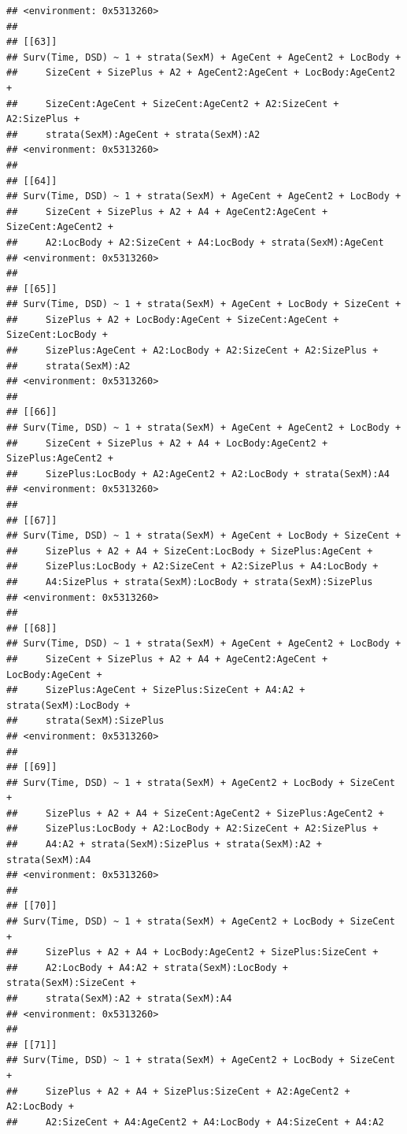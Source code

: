 \documentclass{article}\usepackage[]{graphicx}\usepackage[]{color}
\makeatletter
\newenvironment{kframe}{%
 \def\at@end@of@kframe{}%
 \ifinner\ifhmode%
  \def\at@end@of@kframe{\end{minipage}}%
  \begin{minipage}{\columnwidth}%
 \fi\fi%
 \def\FrameCommand##1{\hskip\@totalleftmargin \hskip-\fboxsep
 \colorbox{shadecolor}{##1}\hskip-\fboxsep
     \hskip-\linewidth \hskip-\@totalleftmargin \hskip\columnwidth}%
 \MakeFramed {\advance\hsize-\width
   \@totalleftmargin\z@ \linewidth\hsize
   \@setminipage}}%
 {\par\unskip\endMakeFramed%
 \at@end@of@kframe}
\newenvironment{knitrout}{}{} %
\makeatother
\begin{document}
\begin{knitrout}
\begin{kframe}
\begin{verbatim}
## <environment: 0x5313260>
## 
## [[63]]
## Surv(Time, DSD) ~ 1 + strata(SexM) + AgeCent + AgeCent2 + LocBody + 
##     SizeCent + SizePlus + A2 + AgeCent2:AgeCent + LocBody:AgeCent2 + 
##     SizeCent:AgeCent + SizeCent:AgeCent2 + A2:SizeCent + A2:SizePlus + 
##     strata(SexM):AgeCent + strata(SexM):A2
## <environment: 0x5313260>
## 
## [[64]]
## Surv(Time, DSD) ~ 1 + strata(SexM) + AgeCent + AgeCent2 + LocBody + 
##     SizeCent + SizePlus + A2 + A4 + AgeCent2:AgeCent + SizeCent:AgeCent2 + 
##     A2:LocBody + A2:SizeCent + A4:LocBody + strata(SexM):AgeCent
## <environment: 0x5313260>
## 
## [[65]]
## Surv(Time, DSD) ~ 1 + strata(SexM) + AgeCent + LocBody + SizeCent + 
##     SizePlus + A2 + LocBody:AgeCent + SizeCent:AgeCent + SizeCent:LocBody + 
##     SizePlus:AgeCent + A2:LocBody + A2:SizeCent + A2:SizePlus + 
##     strata(SexM):A2
## <environment: 0x5313260>
## 
## [[66]]
## Surv(Time, DSD) ~ 1 + strata(SexM) + AgeCent + AgeCent2 + LocBody + 
##     SizeCent + SizePlus + A2 + A4 + LocBody:AgeCent2 + SizePlus:AgeCent2 + 
##     SizePlus:LocBody + A2:AgeCent2 + A2:LocBody + strata(SexM):A4
## <environment: 0x5313260>
## 
## [[67]]
## Surv(Time, DSD) ~ 1 + strata(SexM) + AgeCent + LocBody + SizeCent + 
##     SizePlus + A2 + A4 + SizeCent:LocBody + SizePlus:AgeCent + 
##     SizePlus:LocBody + A2:SizeCent + A2:SizePlus + A4:LocBody + 
##     A4:SizePlus + strata(SexM):LocBody + strata(SexM):SizePlus
## <environment: 0x5313260>
## 
## [[68]]
## Surv(Time, DSD) ~ 1 + strata(SexM) + AgeCent + AgeCent2 + LocBody + 
##     SizeCent + SizePlus + A2 + A4 + AgeCent2:AgeCent + LocBody:AgeCent + 
##     SizePlus:AgeCent + SizePlus:SizeCent + A4:A2 + strata(SexM):LocBody + 
##     strata(SexM):SizePlus
## <environment: 0x5313260>
## 
## [[69]]
## Surv(Time, DSD) ~ 1 + strata(SexM) + AgeCent2 + LocBody + SizeCent + 
##     SizePlus + A2 + A4 + SizeCent:AgeCent2 + SizePlus:AgeCent2 + 
##     SizePlus:LocBody + A2:LocBody + A2:SizeCent + A2:SizePlus + 
##     A4:A2 + strata(SexM):SizePlus + strata(SexM):A2 + strata(SexM):A4
## <environment: 0x5313260>
## 
## [[70]]
## Surv(Time, DSD) ~ 1 + strata(SexM) + AgeCent2 + LocBody + SizeCent + 
##     SizePlus + A2 + A4 + LocBody:AgeCent2 + SizePlus:SizeCent + 
##     A2:LocBody + A4:A2 + strata(SexM):LocBody + strata(SexM):SizeCent + 
##     strata(SexM):A2 + strata(SexM):A4
## <environment: 0x5313260>
## 
## [[71]]
## Surv(Time, DSD) ~ 1 + strata(SexM) + AgeCent2 + LocBody + SizeCent + 
##     SizePlus + A2 + A4 + SizePlus:SizeCent + A2:AgeCent2 + A2:LocBody + 
##     A2:SizeCent + A4:AgeCent2 + A4:LocBody + A4:SizeCent + A4:A2

\end{verbatim}
\end{kframe}
\end{knitrout}
\end{document}
